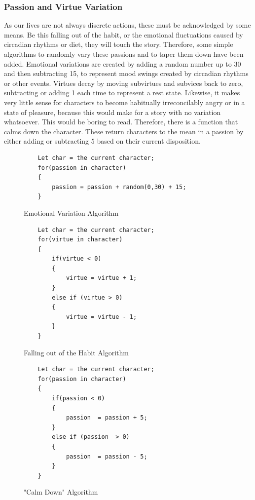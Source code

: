 \documentclass[11pt]{article}
\begin{document}
\subsubsection{Passion and Virtue Variation} 
As our lives are not always discrete actions, these must be acknowledged by some means. Be this falling out of the habit, or the emotional fluctuations caused by circadian rhythms or diet, they will touch the story. Therefore, some simple algorithms to randomly vary these passions and to taper them down have been added. Emotional variations are created by adding a random number up to 30 and then subtracting 15, to represent mood swings created by circadian rhythms or other events. Virtues decay by moving subvirtues and subvices back to zero, subtracting or adding 1 each time to represent a rest state. Likewise, it makes very little sense for characters to become habitually irreconcilably angry or in a state of pleasure, because this would make for a story with no variation whatsoever. This would be boring to read. Therefore, there is a function that calms down the character. These return characters to the mean in a passion by either adding or subtracting 5 based on their current disposition.\\
\begin{figure}[h]
\begin{lstlisting}
	Let char = the current character;
	for(passion in character)
	{
		passion = passion + random(0,30) + 15;
	}

\end{lstlisting}
\caption{Emotional Variation Algorithm}
\end{figure}
\pagebreak
\begin{figure}[h]
\begin{lstlisting}
	Let char = the current character;
	for(virtue in character)
	{
		if(virtue < 0) 
		{
			virtue = virtue + 1;
		}
		else if (virtue > 0)
		{
			virtue = virtue - 1;
		}
	}
\end{lstlisting}
\caption{Falling out of the Habit Algorithm}
\end{figure}
\begin{figure}[h]
\begin{lstlisting}
	Let char = the current character;
	for(passion in character)
	{
		if(passion < 0) 
		{
			passion  = passion + 5;
		}
		else if (passion  > 0)
		{
			passion  = passion - 5;
		}
	}
\end{lstlisting}
\caption{"Calm Down" Algorithm}
\end{figure}
\end{document}
